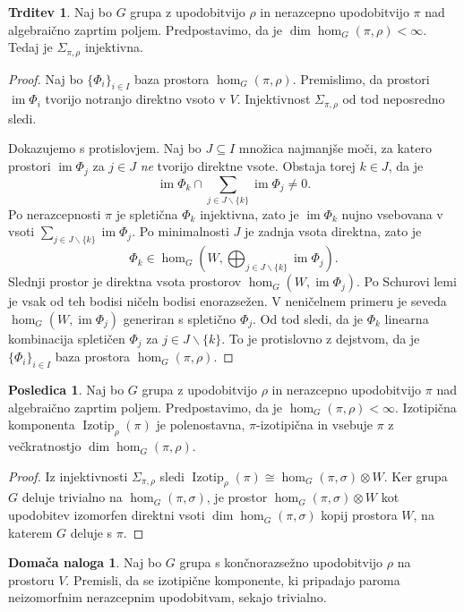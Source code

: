 \documentclass[11pt]{book}
\DeclareMathOperator\image{im}
\DeclareMathOperator\Izotip{Izotip}
\theoremstyle{definition}
\theoremstyle{zgled}
\theoremstyle{odprtproblem}
\theoremstyle{domacanaloga}
\newtheorem*{domacanaloga}{Domača naloga}
\newenvironment{dokaz}
    {\color{siva}\begin{proof}}
    {\end{proof}}
\theoremstyle{izrek}
\newtheorem*{trditev}{Trditev}
\newtheorem*{posledica}{Posledica}
\begin{document}
\begin{trditev}
Naj bo $G$ grupa z upodobitvijo $\rho$ in nerazcepno upodobitvijo $\pi$ nad algebraično zaprtim poljem. Predpostavimo, da je $\dim \hom_G(\pi, \rho) < \infty$. Tedaj je $\Sigma_{\pi, \rho}$ injektivna. 
\end{trditev}
\begin{dokaz}
Naj bo $\{ \Phi_i \}_{i \in I}$ baza prostora $\hom_G(\pi, \rho)$. Premislimo, da prostori $\image \Phi_i$ tvorijo notranjo direktno vsoto v $V$. Injektivnost $\Sigma_{\pi, \rho}$ od tod neposredno sledi.

Dokazujemo s protislovjem. Naj bo $J \subseteq I$ množica najmanjše moči, za katero prostori $\image \Phi_j$ za $j \in J$ \emph{ne} tvorijo direktne vsote. Obstaja torej $k \in J$, da je
\[
    \image \Phi_k \cap \sum_{j \in J \backslash \{ k \}} \image \Phi_j \neq 0.
\]
Po nerazcepnosti $\pi$ je spletična $\Phi_k$ injektivna, zato je $\image \Phi_k$ nujno vsebovana v vsoti $\sum_{j \in J \backslash \{ k \}} \image \Phi_j$. Po minimalnosti $J$ je zadnja vsota direktna, zato je 
\[
    \Phi_k \in \hom_G(W, \bigoplus_{j \in J \backslash \{ k \}} \image \Phi_j).
\]
Slednji prostor je direktna vsota prostorov $\hom_G(W, \image \Phi_j)$. Po Schurovi lemi je vsak od teh bodisi ničeln bodisi enorazsežen. V neničelnem primeru je seveda $\hom_G(W, \image \Phi_j)$ generiran s spletično $\Phi_j$. Od tod sledi, da je $\Phi_k$ linearna kombinacija spletičen $\Phi_j$ za $j \in J \backslash \{ k \}$. To je protislovno z dejstvom, da je $\{ \Phi_i \}_{i \in I}$ baza prostora $\hom_G(\pi, \rho)$.
\end{dokaz}

\begin{posledica}
Naj bo $G$ grupa z upodobitvijo $\rho$ in nerazcepno upodobitvijo $\pi$ nad algebraično zaprtim poljem. Predpostavimo, da je $\hom_G(\pi, \rho) < \infty$. Izotipična komponenta $\Izotip_{\rho}(\pi)$ je polenostavna, $\pi$-izotipična in vsebuje $\pi$ z večkratnostjo $\dim \hom_G(\pi, \rho)$.
\end{posledica}
\begin{dokaz}
Iz injektivnosti $\Sigma_{\pi, \rho}$ sledi $\Izotip_{\rho}(\pi) \cong \hom_G(\pi, \sigma) \otimes W$. Ker grupa $G$ deluje trivialno na $\hom_G(\pi, \sigma)$, je prostor $\hom_G(\pi, \sigma) \otimes W$ kot upodobitev izomorfen direktni vsoti $\dim \hom_G(\pi, \sigma)$ kopij prostora $W$, na katerem $G$ deluje s $\pi$.
\end{dokaz}

\begin{domacanaloga}
Naj bo $G$ grupa s končnorazsežno upodobitvijo $\rho$ na prostoru $V$. Premisli, da se izotipične komponente, ki pripadajo paroma neizomorfnim nerazcepnim upodobitvam, sekajo trivialno.
\end{domacanaloga}
\end{document}
